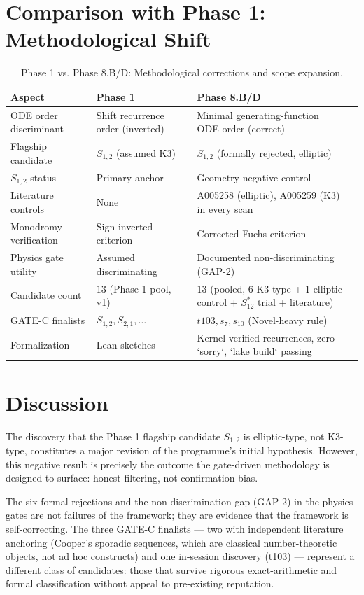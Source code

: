 \documentclass[aps,prd,twocolumn,nofootinbib,superscriptaddress,10pt]{revtex4-2}
\begin{document}
\section{Comparison with Phase 1: Methodological Shift}

\begin{table}[t]
\centering
\caption{Phase 1 vs. Phase 8.B/D: Methodological corrections and scope expansion.}
\label{tab:phase_comparison}
\begin{tabular}{lpp{3cm}p{3cm}}
\toprule
\textbf{Aspect} & \textbf{Phase 1} & \textbf{Phase 8.B/D} \\
\midrule
ODE order discriminant & Shift recurrence order (inverted) & Minimal generating-function ODE order (correct) \\
Flagship candidate & $S_{1,2}$ (assumed K3) & $S_{1,2}$ (formally rejected, elliptic) \\
$S_{1,2}$ status & Primary anchor & Geometry-negative control \\
Literature controls & None & A005258 (elliptic), A005259 (K3) in every scan \\
Monodromy verification & Sign-inverted criterion & Corrected Fuchs criterion \\
Physics gate utility & Assumed discriminating & Documented non-discriminating (GAP-2) \\
Candidate count & $13$ (Phase 1 pool, v1) & $13$ (pooled, 6 K3-type + 1 elliptic control + $S_{12}^*$ trial + literature) \\
GATE-C finalists & $S_{1,2}, S_{2,1}, \ldots$ & $t103, s_7, s_{10}$ (Novel-heavy rule) \\
Formalization & Lean sketches & Kernel-verified recurrences, zero `sorry`, `lake build` passing \\
\bottomrule
\end{tabular}
\end{table}

\section{Discussion}

The discovery that the Phase 1 flagship candidate $S_{1,2}$ is elliptic-type, not K3-type, constitutes a major revision of the programme's initial hypothesis. However, this negative result is precisely the outcome the gate-driven methodology is designed to surface: honest filtering, not confirmation bias.

The six formal rejections and the non-discrimination gap (GAP-2) in the physics gates are not failures of the framework; they are evidence that the framework is self-correcting. The three GATE-C finalists --- two with independent literature anchoring (Cooper's sporadic sequences, which are classical number-theoretic objects, not ad hoc constructs) and one in-session discovery (t103) --- represent a different class of candidates: those that survive rigorous exact-arithmetic and formal classification without appeal to pre-existing reputation.
\end{document}
